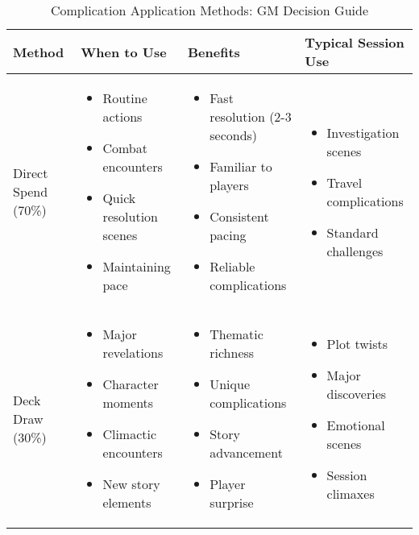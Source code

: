 \begin{table}[htbp]
\centering
\caption{Complication Application Methods: GM Decision Guide}
\begin{tabular}{|p{2.5cm}|p{4cm}|p{4cm}|p{3cm}|}
\hline
\textbf{Method} & \textbf{When to Use} & \textbf{Benefits} & \textbf{Typical Session Use} \\
\hline
Direct Spend (70\%) &
\begin{itemize}
    \item Routine actions
    \item Combat encounters
    \item Quick resolution scenes
    \item Maintaining pace
\end{itemize} &
\begin{itemize}
    \item Fast resolution (2-3 seconds)
    \item Familiar to players
    \item Consistent pacing
    \item Reliable complications
\end{itemize} &
\begin{itemize}
    \item Investigation scenes
    \item Travel complications
    \item Standard challenges
\end{itemize} \\
\hline
Deck Draw (30\%) &
\begin{itemize}
    \item Major revelations
    \item Character moments
    \item Climactic encounters
    \item New story elements
\end{itemize} &
\begin{itemize}
    \item Thematic richness
    \item Unique complications
    \item Story advancement
    \item Player surprise
\end{itemize} &
\begin{itemize}
    \item Plot twists
    \item Major discoveries
    \item Emotional scenes
    \item Session climaxes
\end{itemize} \\
\hline
\end{tabular}
\end{table}

